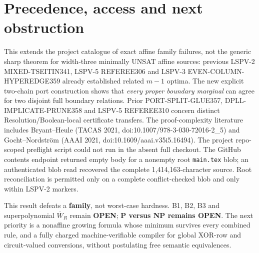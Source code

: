 \documentclass[11pt]{article}
\begin{document}
\section*{Precedence, access and next obstruction}
This extends the project catalogue of exact affine family failures, not the generic sharp theorem for width-three minimally UNSAT affine sources: previous LSPV-2 MIXED-TSEITIN341, LSPV-5 REFEREE306 and LSPV-3 EVEN-COLUMN-HYPEREDGE359 already established related $m-1$ optima. The new explicit two-chain port construction shows that \emph{every proper boundary marginal} can agree for two disjoint full boundary relations. Prior PORT-SPLIT-GLUE357, DPLL-IMPLICATE-PRUNE358 and LSPV-5 REFEREE310 concern distinct Resolution/Boolean-local certificate transfers. The proof-complexity literature includes Bryant--Heule (TACAS 2021, doi:10.1007/978-3-030-72016-2\_5) and Gocht--Nordstr\"om (AAAI 2021, doi:10.1609/aaai.v35i5.16494). The project repo-scoped preflight script could not run in the absent full checkout. The GitHub contents endpoint returned empty body for a nonempty root \texttt{main.tex} blob; an authenticated blob read recovered the complete 1,414,163-character source. Root reconciliation is permitted only on a complete conflict-checked blob and only within LSPV-2 markers.

This result defeats a \textbf{family}, not worst-case hardness. B1, B2, B3 and superpolynomial $\overline W_R$ remain \textbf{OPEN}; \textbf{P versus NP remains OPEN}. The next priority is a nonaffine growing formula whose minimum survives every combined rule, and a fully charged machine-verifiable compiler for global XOR-row and circuit-valued conversions, without postulating free semantic equivalences.
\end{document}
